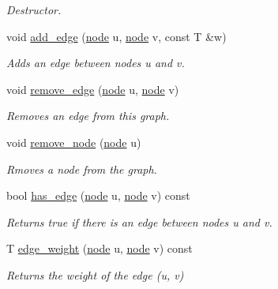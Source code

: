 \begin{DoxyCompactItemize}
\begin{DoxyCompactList}\small\item\em Destructor. \end{DoxyCompactList}\item 
void \hyperlink{classlgraph_1_1utils_1_1wdgraph_a5c96c31a8b5d70829bf023382d7c1997}{add\+\_\+edge} (\hyperlink{namespacelgraph_1_1utils_a7bd66ede3805ef121bc2835bd48de0cf}{node} u, \hyperlink{namespacelgraph_1_1utils_a7bd66ede3805ef121bc2835bd48de0cf}{node} v, const T \&w)
\begin{DoxyCompactList}\small\item\em Adds an edge between nodes {\itshape u} and {\itshape v}. \end{DoxyCompactList}\item 
void \hyperlink{classlgraph_1_1utils_1_1wdgraph_a6b2ec7e7c66f0ae5aa8ebe5d0555c3a7}{remove\+\_\+edge} (\hyperlink{namespacelgraph_1_1utils_a7bd66ede3805ef121bc2835bd48de0cf}{node} u, \hyperlink{namespacelgraph_1_1utils_a7bd66ede3805ef121bc2835bd48de0cf}{node} v)
\begin{DoxyCompactList}\small\item\em Removes an edge from this graph. \end{DoxyCompactList}\item 
void \hyperlink{classlgraph_1_1utils_1_1wdgraph_a63740b25bf07d9943150c2c50d8be133}{remove\+\_\+node} (\hyperlink{namespacelgraph_1_1utils_a7bd66ede3805ef121bc2835bd48de0cf}{node} u)
\begin{DoxyCompactList}\small\item\em Rmoves a node from the graph. \end{DoxyCompactList}\item 
bool \hyperlink{classlgraph_1_1utils_1_1wdgraph_ac74f172c5a6bdbf56ac5a4013fae880a}{has\+\_\+edge} (\hyperlink{namespacelgraph_1_1utils_a7bd66ede3805ef121bc2835bd48de0cf}{node} u, \hyperlink{namespacelgraph_1_1utils_a7bd66ede3805ef121bc2835bd48de0cf}{node} v) const 
\begin{DoxyCompactList}\small\item\em Returns true if there is an edge between nodes {\itshape u} and {\itshape v}. \end{DoxyCompactList}\item 
T \hyperlink{classlgraph_1_1utils_1_1wdgraph_a1d86f87f61f47af9251945c14385c4e4}{edge\+\_\+weight} (\hyperlink{namespacelgraph_1_1utils_a7bd66ede3805ef121bc2835bd48de0cf}{node} u, \hyperlink{namespacelgraph_1_1utils_a7bd66ede3805ef121bc2835bd48de0cf}{node} v) const 
\begin{DoxyCompactList}\small\item\em Returns the weight of the edge ({\itshape u}, {\itshape v}) \end{DoxyCompactList}\item 

\end{DoxyCompactItemize}
